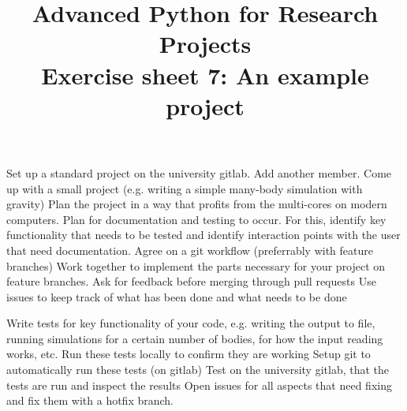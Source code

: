 \documentclass[]{erlangen-problemset}
\title{{\Large Advanced Python for Research Projects} \\[0.3cm] 
Exercise sheet 7: An example project}
\begin{document}


\begin{problem}[title={Planning a project}]
\noindent
\Question 
\end{problem}


\begin{problem}[title={Working with other members}]
\noindent
\Question Set up a standard project on the university gitlab.
\Question Add another member.
\Question Come up with a small project (e.g. writing a simple many-body simulation with gravity)
\Question Plan the project in a way that profits from the multi-cores on modern computers. Plan for documentation and testing to occur. 
For this, identify key functionality that needs to be tested and identify interaction points with the user that need documentation.
\Question Agree on a git workflow (preferrably with feature branches)
\Question Work together to implement the parts necessary for your project on feature branches. Ask for feedback before merging through pull requests
\Question Use issues to keep track of what has been done and what needs to be done
\end{problem}

\begin{problem}[title={Automated testing}]
\noindent
\Question Write tests for key functionality of your code, e.g. writing the output to file, running simulations for a certain number of bodies, for how the input reading works, etc.
\Question Run these tests locally to confirm they are working
\Question Setup git to automatically run these tests (on gitlab)
\Question Test on the university gitlab, that the tests are run and inspect the results
\Question Open issues for all aspects that need fixing and fix them with a hotfix branch. 
\end{problem}

\end{document}
